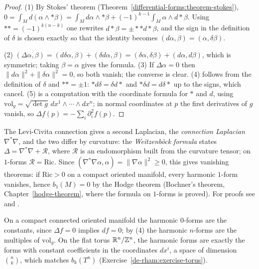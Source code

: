 \begin{proof}
(1) By Stokes' theorem (Theorem~\ref{differential-forms:theorem-stokes}), $0 = \int_Md(\alpha \wedge *\beta) = \int_Md\alpha \wedge *\beta + (-1)^{k-1}\int_M\alpha \wedge d{*}\beta$. Using $** = (-1)^{k(n-k)}$ one
rewrites $d*\beta = \pm *{*}d{*}\beta$, and the sign in the definition of $\delta$ is chosen exactly so that the identity becomes $(d\alpha, \beta) = (\alpha, \delta\beta)$.

(2) $(\Delta\alpha, \beta) = (d\delta\alpha, \beta) + (\delta d\alpha, \beta) = (\delta\alpha, \delta\beta) + (d\alpha, d\beta)$, which is symmetric; taking $\beta = \alpha$ gives the formula. (3) If $\Delta\alpha = 0$ then
$\|d\alpha\|^2 + \|\delta\alpha\|^2 = 0$, so both vanish; the converse is clear. (4) follows from the definition of $\delta$ and $** = \pm 1$: $*d\delta = \delta d*$ and $*\delta d = d\delta*$ up to the signs, which
cancel. (5) is a computation with the coordinate formula for $*$ and $d$, using $\mathrm{vol}_g = \sqrt{\det g}\,dx^1\wedge\cdots\wedge dx^n$; in normal coordinates at $p$ the first derivatives of $g$ vanish, so
$\Delta f(p) = -\sum_i\partial_i^2f(p)$.
\end{proof}

\begin{remark}\label{riemannian-geometry:remark-weitzenbock}
The Levi-Civita connection gives a second Laplacian, the \emph{connection Laplacian} $\nabla^*\nabla$, and the two differ by curvature: the \emph{Weitzenb\"ock formula} states
$\Delta = \nabla^*\nabla + \mathcal{R}$, where $\mathcal{R}$ is an endomorphism built from the curvature tensor; on $1$-forms $\mathcal{R} = \mathrm{Ric}$. Since $(\nabla^*\nabla\alpha, \alpha) = \|\nabla\alpha\|^2 \geq 0$,
this gives vanishing theorems: if $\mathrm{Ric} > 0$ on a compact oriented manifold, every harmonic $1$-form vanishes, hence $b_1(M) = 0$ by the Hodge theorem (Bochner's theorem,
Chapter~\ref{hodge-theorem}, where the formula on $1$-forms is proved). For proofs see \cite[Chapter 6]{warner-foundations} and \cite[Chapter 4]{lee-riemannian}.
\end{remark}

\begin{example}\label{riemannian-geometry:example-harmonic-forms}
On a compact connected oriented manifold the harmonic $0$-forms are the constants, since $\Delta f = 0$ implies $df = 0$; by (4) the harmonic $n$-forms are the multiples of $\mathrm{vol}_g$. On the flat torus
$\mathbb{R}^n/\mathbb{Z}^n$, the harmonic forms are exactly the forms with constant coefficients in the coordinates $dx^i$, a space of dimension $\binom{n}{k}$, which matches $b_k(T^n)$
(Exercise~\ref{de-rham:exercise-torus}).
\end{example}

